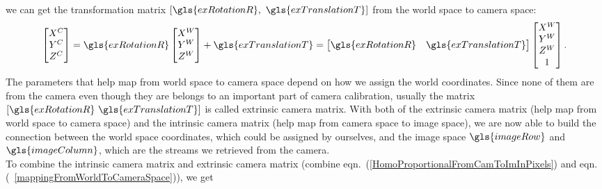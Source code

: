 %
we can get the transformation matrix \([\gls{exRotationR} ,\,\, \gls{exTranslationT}]\) from the world space to camera space:
%
\begin{equation}
\begin{bmatrix} 
X^{C} \\
Y^{C} \\
Z^{C}
 \end{bmatrix}%
=  \gls{exRotationR} \begin{bmatrix} 
X^{W} \\
Y^{W} \\
Z^{W}
 \end{bmatrix}%
 + \gls{exTranslationT}
=
\begin{bmatrix} 
\gls{exRotationR} & \gls{exTranslationT} \\
\end{bmatrix}%
 \begin{bmatrix} 
X^{W} \\
Y^{W} \\
Z^{W} \\
1
 \end{bmatrix}  .%
\label{mappingFromWorldToCameraSpace}
\end{equation}%
%
%
\noindent
The parameters that help map from world space to camera space depend on how we assign the world coordinates. Since none of them are from the camera even though they are belongs to an important part of camera calibration, usually the matrix \([\gls{exRotationR} \,\, \gls{exTranslationT}]\) is called extrinsic camera matrix. With both of the extrinsic camera matrix (help map from world space to camera space) and the intrinsic camera matrix (help map from camera space to image space), we are now able to build the connection between the world space coordinates, which could be assigned by ourselves, and the image space \(\gls{imageRow}\) and \(\gls{imageColumn}\), which are the streams we retrieved from the camera. 
\\\indent
To combine the intrinsic camera matrix and extrinsic camera matrix (combine eqn.~(\ref{HomoProportionalFromCamToImInPixels}) and eqn.(~\ref{mappingFromWorldToCameraSpace})), we get 

